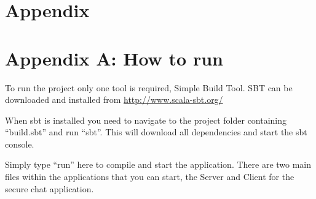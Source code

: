 \section{Appendix}
\section*{Appendix A: How to run}
To run the project only one tool is required, Simple Build Tool. SBT can be downloaded and installed from \href{http://www.scala-sbt.org/}{http://www.scala-sbt.org/}

When sbt is installed you need to navigate to the project folder containing ``build.sbt'' and run ``sbt''. This will download all dependencies and start the sbt console. 

Simply type ``run'' here to compile and start the application. There are two main files within the applications that you can start, the Server and Client for the secure chat application.
